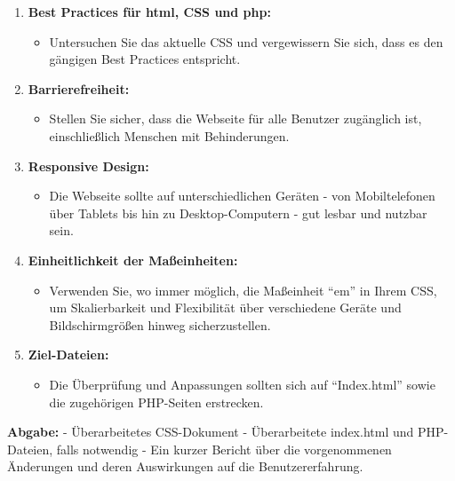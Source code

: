 \documentclass[12pt,a4paper]{scrartcl}
\newcommand{\tightlist}{
  \setlength{\itemsep}{0pt}\setlength{\parskip}{0pt}
}
\begin{document}
\begin{enumerate}
\def\labelenumi{\arabic{enumi}.}
\tightlist
\item
  \textbf{Best Practices für html, CSS und php:}

  \begin{itemize}
  \tightlist
  \item
    Untersuchen Sie das aktuelle CSS und vergewissern Sie sich, dass es
    den gängigen Best Practices entspricht.
  \end{itemize}
\item
  \textbf{Barrierefreiheit:}

  \begin{itemize}
  \tightlist
  \item
    Stellen Sie sicher, dass die Webseite für alle Benutzer zugänglich
    ist, einschließlich Menschen mit Behinderungen.
  \end{itemize}
\item
  \textbf{Responsive Design:}

  \begin{itemize}
  \tightlist
  \item
    Die Webseite sollte auf unterschiedlichen Geräten - von
    Mobiltelefonen über Tablets bis hin zu Desktop-Computern - gut
    lesbar und nutzbar sein.
  \end{itemize}
\item
  \textbf{Einheitlichkeit der Maßeinheiten:}

  \begin{itemize}
  \tightlist
  \item
    Verwenden Sie, wo immer möglich, die Maßeinheit ``em'' in Ihrem CSS,
    um Skalierbarkeit und Flexibilität über verschiedene Geräte und
    Bildschirmgrößen hinweg sicherzustellen.
  \end{itemize}
\item
  \textbf{Ziel-Dateien:}

  \begin{itemize}
  \tightlist
  \item
    Die Überprüfung und Anpassungen sollten sich auf ``Index.html''
    sowie die zugehörigen PHP-Seiten erstrecken.
  \end{itemize}
\end{enumerate}

\textbf{Abgabe:} - Überarbeitetes CSS-Dokument - Überarbeitete
index.html und PHP-Dateien, falls notwendig - Ein kurzer Bericht über
die vorgenommenen Änderungen und deren Auswirkungen auf die
Benutzererfahrung.
\end{document}
